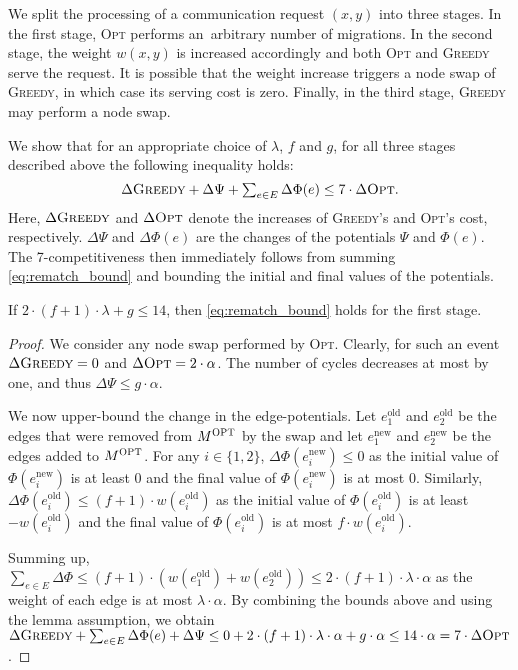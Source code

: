 \documentclass{siamart190516}
\newcommand{\GREEDY}{\textsc{Greedy}\xspace}
\newcommand{\MOPT}{M^\textsc{OPT}}
\newcommand{\OPT}{\textsc{Opt}\xspace}
\newcommand{\eold}{e^\textrm{old}}
\newcommand{\enew}{e^\textrm{new}}
\begin{document}
We split the processing of a communication request $(x,y)$ into three stages. In
the first stage, \OPT performs an~arbitrary number of migrations. In the
second stage, the weight $w(x,y)$ is increased accordingly and both \OPT and
\GREEDY serve the request. It is possible that the weight increase triggers a
node swap of \GREEDY, in which case its serving cost is zero. Finally, in the
third stage, \GREEDY may perform a node swap.

We show that for an appropriate choice of $\lambda$, $f$ and $g$, for all
three stages described above the following inequality holds:
\begin{equation}
\label{eq:rematch_bound}
	\textstyle \Delta \GREEDY + \Delta \Psi + \sum_{e \in E} \Delta \Phi(e) \leq 7 \cdot \Delta \OPT.
\end{equation}
Here, $\Delta \GREEDY$ and $\Delta \OPT$ denote the increases of \GREEDY's and
\OPT's cost, respectively. $\Delta \Psi$ and $\Delta \Phi(e)$ are the changes
of the potentials $\Psi$ and $\Phi(e)$. The 7-competitiveness then immediately
follows from summing \eqref{eq:rematch_bound} and bounding the initial and
final values of the potentials. 

\begin{lemma}
\label{lem:opt_swap}
If $2 \cdot (f+1) \cdot \lambda + g \leq 14$, then \eqref{eq:rematch_bound}
holds for the first stage.
\end{lemma}

\begin{proof}
We consider any node swap performed by \OPT. Clearly, for such an event
$\Delta \GREEDY = 0$ and $\Delta \OPT = 2 \cdot \alpha$. The number of cycles
decreases at most by one, and thus $\Delta \Psi \leq g \cdot \alpha$.

We now upper-bound the change in the edge-potentials. Let $\eold_1$ and
$\eold_2$ be the edges that were removed from $\MOPT$ by the swap and let
$\enew_1$ and $\enew_2$ be the edges added to $\MOPT$. For any $i \in
\{1,2\}$, $\Delta \Phi(\enew_i) \leq 0$ as the initial value of
$\Phi(\enew_i)$ is at least $0$ and the final value of $\Phi(\enew_i)$ is at
most $0$. Similarly, $\Delta \Phi(\eold_i) \leq (f+1) \cdot w(\eold_i)$ as the
initial value of $\Phi(\eold_i)$ is at least $-w(\eold_i)$ and the final value
of $\Phi(\eold_i)$ is at most $f \cdot w(\eold_i)$.

Summing up, $\sum_{e \in E} \Delta \Phi \leq (f+1) \cdot (w(\eold_1) +
w(\eold_2)) \leq 2 \cdot (f+1) \cdot \lambda \cdot \alpha$ as the weight of each edge
is at most $\lambda \cdot \alpha$. By combining the bounds above and using the
lemma assumption, we obtain $\Delta \GREEDY + \sum_{e \in E} \Delta \Phi(e) +
\Delta \Psi \leq 0 + 2 \cdot (f+1) \cdot \lambda \cdot \alpha + g \cdot \alpha 
\leq 14 \cdot \alpha = 7 \cdot \Delta \OPT$.
\end{proof}
\end{document}
